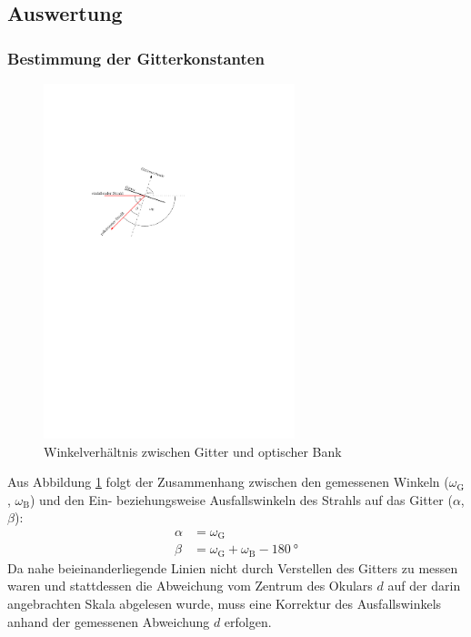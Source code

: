 \documentclass[11pt, a4paper]{article}
\numberwithin{equation}{section}
\begin{document}
\subsection{Auswertung}

\subsubsection{Bestimmung der Gitterkonstanten}
\label{sssec:gitterkonstante}
\begin{figure}[h]
	\centering
	\includegraphics[width=0.65\textwidth]{./figures/winkelverhaeltniss.pdf}
	\caption{Winkelverhältnis zwischen Gitter und optischer Bank}
	\label{fig:winkelverhaeltnis}
\end{figure}
Aus Abbildung \ref{fig:winkelverhaeltnis} folgt der Zusammenhang zwischen den gemessenen Winkeln ($\omega_\mathrm{G}$, $\omega_\mathrm{B}$) und den Ein- beziehungsweise Ausfallswinkeln des Strahls auf das Gitter ($\alpha$, $\beta$): 
\begin{align}
	\alpha &= \omega_\text{G} \\
	\beta &= \omega_\text{G} + \omega_\text{B} - \SI{180}{\degree}
	\label{eq:reflexionswinkel}
\end{align}
Da nahe beieinanderliegende Linien nicht durch Verstellen des Gitters zu messen waren und stattdessen die Abweichung vom Zentrum des Okulars $d$ auf der darin angebrachten Skala abgelesen wurde, muss eine Korrektur des Ausfallswinkels anhand der gemessenen Abweichung $d$ erfolgen.
\end{document}
